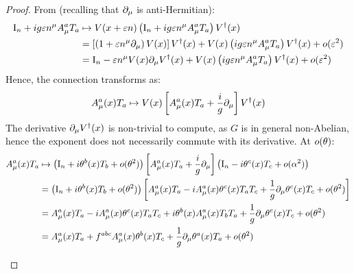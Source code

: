 \begin{proofbox}
  \begin{proof}
    From  (recalling that $ \partial_\mu $ is anti-Hermitian):
    \begin{equation*}
      \begin{split}
        \mathrm{I}_n + i g \varepsilon n^\mu A_\mu^a T_a
        & \mapsto V(x + \varepsilon n) \left( \mathrm{I}_n + i g \varepsilon n^\mu A_\mu^a T_a \right) V^\dagger(x) \\
        & = \left[ \left( 1 + \varepsilon n^\mu \partial_\mu \right) V(x) \right] V^\dagger(x) + V(x) \left( i g \varepsilon n^\mu A_\mu^a T_a \right) V^\dagger(x) + o(\varepsilon^2) \\
        & = \mathrm{I}_n - \varepsilon n^\mu V(x) \partial_\mu V^\dagger(x) + V(x) \left( i g \varepsilon n^\mu A_\mu^a T_a \right) V^\dagger(x) + o(\varepsilon^2)
      \end{split}
    \end{equation*}
    Hence, the connection transforms as:
    \begin{equation*}
      A_\mu^a(x) T_a \mapsto V(x) \left[ A_\mu^a(x) T_a + \frac{i}{g} \partial_\mu \right] V^\dagger(x)
    \end{equation*}
    The derivative $ \partial_\mu V^\dagger(x) $ is non-trivial to compute, as $ G $ is in general non-Abelian, hence the exponent does not necessarily commute with its derivative. At $ o(\theta) $:
    \begin{equation*}
      \begin{split}
        A_\mu^a(x) T_a
        & \mapsto \left( \mathrm{I}_n + i \theta^b(x) T_b + o(\theta^2) \right) \left[ A_\mu^a(x) T_a + \frac{i}{g} \partial_\mu \right] \left( \mathrm{I}_n - i \theta^c(x) T_c + o(\alpha^2) \right) \\
        & = \left( \mathrm{I}_n + i \theta^b(x) T_b + o(\theta^2) \right) \left[ A_\mu^a(x) T_a - i A_\mu^a(x) \theta^c(x) T_a T_c + \frac{1}{g} \partial_\mu \theta^c(x) T_c + o(\theta^2) \right] \\
        & = A_\mu^a(x) T_a - i A_\mu^a(x) \theta^c(x) T_a T_c + i \theta^b(x) A_\mu^a(x) T_b T_a + \frac{1}{g} \partial_\mu \theta^c(x) T_c + o(\theta^2) \\
        & = A_\mu^a(x) T_a + f^{abc} A_\mu^a(x) \theta^b(x) T_c + \frac{1}{g} \partial_\mu \theta^a(x) T_a + o(\theta^2)
      \end{split}
    \end{equation*}
    \begin{equation*}
      \begin{split}

\end{split}
\end{equation*}
\end{proof}
\end{proofbox}
